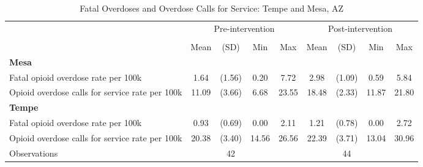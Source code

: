 \begin{table}[htbp]\centering
\def\sym#1{\ifmmode^{#1}\else\(^{#1}\)\fi}
\caption{\centering Fatal Overdoses and Overdose Calls for Service: Tempe and Mesa, AZ}
\begin{tabular}{l*{2}{cccc}}
\toprule
                &\multicolumn{4}{c}{Pre-intervention}                &\multicolumn{4}{c}{Post-intervention}                \\
                &\multicolumn{4}{c}{}                   &\multicolumn{4}{c}{}                   \\
                &     Mean&     (SD)&      Min&      Max&     Mean&     (SD)&      Min&      Max\\
\midrule
\textbf{Mesa}           &         &         &         &         &         &         &         &         \\
Fatal opioid overdose rate per 100k&     1.64&   (1.56)&     0.20&     7.72&     2.98&   (1.09)&     0.59&     5.84\\
Opioid overdose calls for service rate per 100k&    11.09&   (3.66)&     6.68&    23.55&    18.48&   (2.33)&    11.87&    21.80\\
\midrule
\textbf{Tempe}         &         &         &         &         &         &         &         &         \\
Fatal opioid overdose rate per 100k&     0.93&   (0.69)&     0.00&     2.11&     1.21&   (0.78)&     0.00&     2.72\\
Opioid overdose calls for service rate per 100k&    20.38&   (3.40)&    14.56&    26.56&    22.39&   (3.71)&    13.04&    30.96\\
\midrule
Observations    &       &         42&         &         &      &         44&        &         \\
\bottomrule
\end{tabular}
\end{table}
